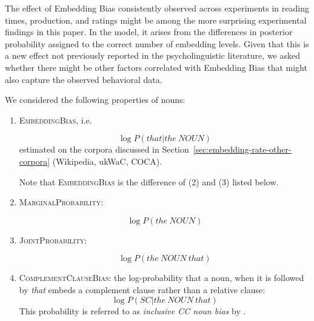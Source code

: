 The effect of Embedding Bias consistently observed across experiments in reading times, production, and ratings might be among the more surprising experimental findings in this paper.
In the model, it arises from the differences in posterior probability assigned to the correct number of embedding levels.
Given that this is a new effect not previously reported in the psycholinguistic literature, we asked whether there might be other factors correlated with Embedding Bias that might also capture the observed behavioral data.

We considered the following properties of nouns:
\begin{enumerate}
	\item \textsc{EmbeddingBias}, i.e.

\begin{equation}
		\log P(that|the\ NOUN)
\end{equation}
		estimated on the corpora discussed in Section~\ref{sec:embedding-rate-other-corpora} (Wikipedia, ukWaC, COCA).

		Note that \textsc{EmbeddingBias} is the difference  of (2) and (3) listed below.

	\item \textsc{MarginalProbability}:

\begin{equation}
		\log P(the\ NOUN)
\end{equation}



\item \textsc{JointProbability}:

\begin{equation}
		\log P(the\ NOUN\ that)
\end{equation}



\item \textsc{ComplementClauseBias}: the log-probability that a noun, when it is followed by \textit{that} embeds a complement clause rather than a relative clause:
\begin{equation}
		\log P(SC|the\ NOUN\ that)
\end{equation}
This probability is referred to as \emph{inclusive CC noun bias} by \citet{Staub2018RelativeCA}.



\end{enumerate}
